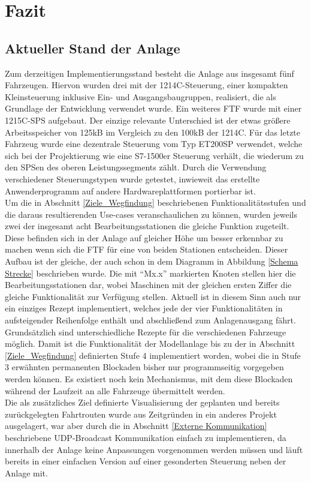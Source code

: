 \chapter{Fazit}

\section{Aktueller Stand der Anlage}
	\label{Stand}
	Zum derzeitigen Implementierungsstand besteht die Anlage aus insgesamt fünf Fahrzeugen. Hiervon wurden drei mit der 1214C-Steuerung, einer kompakten Kleinsteuerung inklusive Ein- und Ausgangsbaugruppen, realisiert, die als Grundlage der Entwicklung verwendet wurde. Ein weiteres \ac{FTF} wurde mit einer 1215C-\ac{SPS} aufgebaut. Der einzige relevante Unterschied ist der etwas größere Arbeitsspeicher von 125kB im Vergleich zu den 100kB der 1214C. Für das letzte Fahrzeug wurde eine dezentrale Steuerung vom Typ ET200SP verwendet, welche sich bei der Projektierung wie eine S7-1500er Steuerung verhält, die wiederum zu den \ac{SPS}en des oberen Leistungssegments zählt. Durch die Verwendung verschiedener Steuerungstypen wurde getestet, inwieweit das erstellte Anwenderprogramm auf andere Hardwareplattformen portierbar ist. 
	\\[4pt]
	Um die in Abschnitt \ref{Ziele_Wegfindung} beschriebenen Funktionalitätsstufen und die daraus resultierenden Use-cases veranschaulichen zu können, wurden jeweils zwei der insgesamt acht Bearbeitungsstationen die gleiche Funktion zugeteilt. Diese befinden sich in der Anlage auf gleicher Höhe um besser erkennbar zu machen wenn sich die \ac{FTF} für eine von beiden Stationen entscheiden. Dieser Aufbau ist der gleiche, der auch schon in dem Diagramm in Abbildung \ref{Schema Strecke} beschrieben wurde. Die mit "`Mx.x"' markierten Knoten stellen hier die Bearbeitungsstationen dar, wobei Maschinen mit der gleichen ersten Ziffer die gleiche Funktionalität zur Verfügung stellen. Aktuell ist in diesem Sinn auch nur ein einziges Rezept implementiert, welches jede der vier Funktionalitäten in aufsteigender Reihenfolge enthält und abschließend zum Anlagenausgang fährt. Grundsätzlich sind unterschiedliche Rezepte für die verschiedenen Fahrzeuge möglich. Damit ist die Funktionalität der Modellanlage bis zu der in Abschnitt \ref{Ziele_Wegfindung} definierten Stufe 4 implementiert worden, wobei die in Stufe 3 erwähnten permanenten Blockaden bisher nur programmseitig vorgegeben werden können. Es existiert noch kein Mechanismus, mit dem diese Blockaden während der Laufzeit an alle Fahrzeuge übermittelt werden.
	\\[4pt]
	Die als zusätzliches Ziel definierte Visualisierung der geplanten und bereits zurückgelegten Fahrtrouten wurde aus Zeitgründen in ein anderes Projekt ausgelagert, war aber durch die in Abschnitt \ref{Externe Kommunikation} beschriebene \ac{UDP}-Broadcast Kommunikation einfach zu implementieren, da innerhalb der Anlage keine Anpassungen vorgenommen werden müssen und läuft bereits in einer einfachen Version auf einer gesonderten Steuerung neben der Anlage mit.
	
